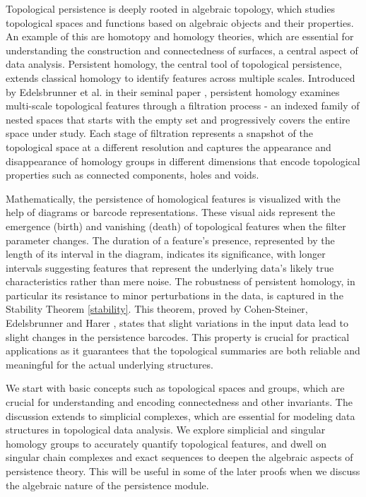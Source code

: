 Topological persistence is deeply rooted in algebraic topology, which studies topological
spaces and functions based on algebraic objects and their properties. An example
of this are homotopy and homology theories, which are essential for understanding
the construction and connectedness of surfaces, a central aspect of data
analysis. Persistent homology, the central tool of topological persistence, extends
classical homology to identify features across multiple scales. Introduced by
Edelsbrunner et al. in their seminal paper \cite{edelsbrunner2000triangulations},
persistent homology examines multi-scale topological features through a
filtration process - an indexed family of nested spaces that starts with the
empty set and progressively covers the entire space under study. Each stage of filtration
represents a snapshot of the topological space at a different resolution and captures
the appearance and disappearance of homology groups in different dimensions that
encode topological properties such as connected components, holes and voids.

Mathematically, the persistence of homological features is visualized with the help
of diagrams or barcode representations. These visual aids represent the
emergence (birth) and vanishing (death) of topological features when the filter
parameter changes. The duration of a feature's presence, represented by the
length of its interval in the diagram, indicates its significance, with longer
intervals suggesting features that represent the underlying data's likely true
characteristics rather than mere noise. The robustness of persistent homology,
in particular its resistance to minor perturbations in the data, is captured in the
Stability Theorem \ref{stability}. This theorem, proved by Cohen-Steiner, Edelsbrunner and Harer
\cite{bendich2007inferring}, states that slight variations in the input data lead
to slight changes in the persistence barcodes. This property is crucial for
practical applications as it guarantees that the topological summaries are both
reliable and meaningful for the actual underlying structures.

We start with basic concepts such as topological spaces and groups, which are crucial
for understanding and encoding connectedness and other invariants. The
discussion extends to simplicial complexes, which are essential for modeling data
structures in topological data analysis. We explore simplicial and singular
homology groups to accurately quantify topological features, and dwell on singular
chain complexes and exact sequences to deepen the algebraic aspects of persistence theory. This will be useful in some of the later proofs when we discuss the algebraic
nature of the persistence module.


